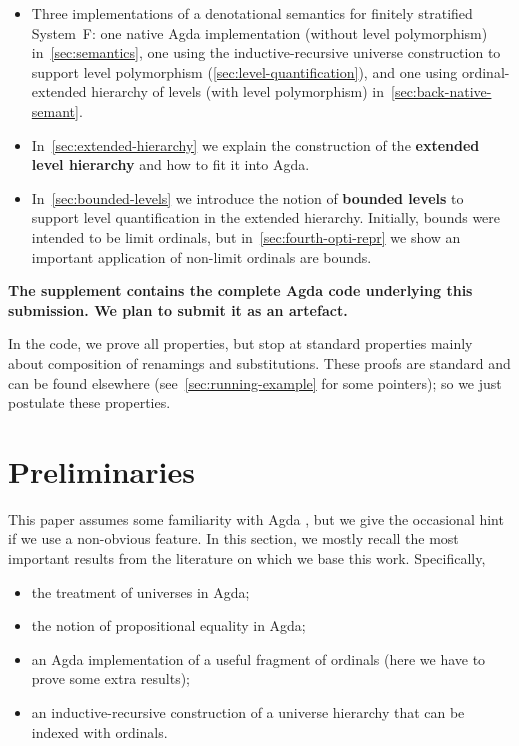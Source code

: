 \documentclass[manuscript,screen,review,anonymous]{acmart}
\begin{document}
\begin{itemize}
\item Three implementations of a denotational semantics for finitely
  stratified System~F: one native Agda implementation (without level
  polymorphism) in~\cref{sec:semantics}, one using the
  inductive-recursive universe construction to support level
  polymorphism (\cref{sec:level-quantification}), and one using ordinal-extended hierarchy of levels
  (with level polymorphism) in~\cref{sec:back-native-semant}.
\item In~\cref{sec:extended-hierarchy} we explain the construction of
  the \textbf{extended level hierarchy} and how to fit it into Agda.
\item In~\cref{sec:bounded-levels} we introduce the
  notion of \textbf{bounded levels} to support level quantification in the
  extended hierarchy. Initially, bounds were intended to be limit
  ordinals, but in~\cref{sec:fourth-opti-repr} we show an important
  application of non-limit ordinals are bounds.
\end{itemize}

\textbf{The supplement contains the complete Agda code underlying this
  submission. We plan to submit it as an artefact.}

In the code, we prove all properties, but stop at standard properties
mainly about composition of renamings and substitutions. These proofs
are standard and can be found elsewhere
(see~\cref{sec:running-example} for some pointers); so we just postulate these properties.

\section{Preliminaries}
\label{sec:preliminaries}

This paper assumes some familiarity with Agda
\cite{DBLP:conf/icfp/Norell13}, but we give the occasional hint if we
use a non-obvious feature. In this section, we mostly recall the most
important results from the literature on which we base this
work. Specifically,
\begin{itemize}
\item the treatment of universes in Agda;
\item the notion of propositional equality in Agda;
\item an Agda implementation of a useful fragment of ordinals (here we
  have to prove some extra results);
\item an inductive-recursive construction of a universe hierarchy that
  can be indexed with ordinals.
\end{itemize}
\end{document}
